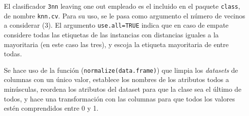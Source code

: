 \documentclass[a4paper,11pt]{article}
\begin{document}
El clasificador \texttt{3nn} leaving one out empleado es el incluido en el paquete \texttt{class}, de nombre
\texttt{knn.cv}. Para su uso, se le pasa como argumento el número de vecinos a considerar (3). El argumento 
\texttt{use.all=TRUE} indica que en caso de empate considere todas las etiquetas de las instancias con distancias 
iguales a la mayoritaria (en este caso las tres), y escoja la etiqueta mayoritaria de entre todas. 

Se hace uso de la función (\texttt{normalize(data.frame)}) que limpia los \textit{datasets} de columnas con
un único valor, establece los nombres de los atributos todos a minúsculas, reordena los atributos del dataset para que
la clase sea el último de todos, y hace una transformación con las columnas para que todos los valores estén comprendidos
entre 0 y 1.
\end{document}
